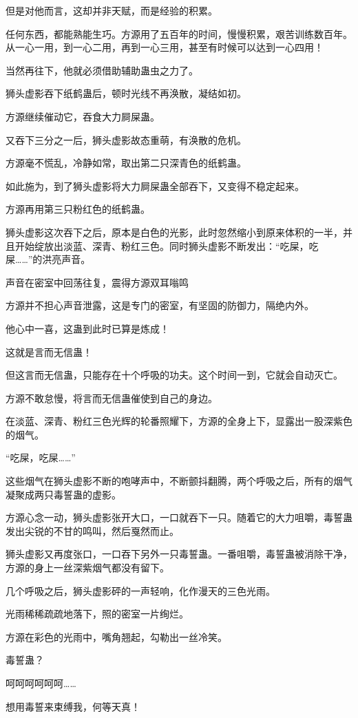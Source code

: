 \begin{this_body}
但是对他而言，这却并非天赋，而是经验的积累。

任何东西，都能熟能生巧。方源用了五百年的时间，慢慢积累，艰苦训练数百年。从一心一用，到一心二用，再到一心三用，甚至有时候可以达到一心四用！

当然再往下，他就必须借助辅助蛊虫之力了。

狮头虚影吞下纸鹤蛊后，顿时光线不再涣散，凝结如初。

方源继续催动它，吞食大力屙屎蛊。

又吞下三分之一后，狮头虚影故态重萌，有涣散的危机。

方源毫不慌乱，冷静如常，取出第二只深青色的纸鹤蛊。

如此施为，到了狮头虚影将大力屙屎蛊全部吞下，又变得不稳定起来。

方源再用第三只粉红色的纸鹤蛊。

狮头虚影这次吞下之后，原本是白色的光影，此时忽然缩小到原来体积的一半，并且开始绽放出淡蓝、深青、粉红三色。同时狮头虚影不断发出：“吃屎，吃屎……”的洪亮声音。

声音在密室中回荡往复，震得方源双耳嗡鸣

方源并不担心声音泄露，这是专门的密室，有坚固的防御力，隔绝内外。

他心中一喜，这蛊到此时已算是炼成！

这就是言而无信蛊！

但这言而无信蛊，只能存在十个呼吸的功夫。这个时间一到，它就会自动灭亡。

方源不敢怠慢，将言而无信蛊催使到自己的身边。

在淡蓝、深青、粉红三色光辉的轮番照耀下，方源的全身上下，显露出一股深紫色的烟气。

“吃屎，吃屎……”

这些烟气在狮头虚影不断的咆哮声中，不断颤抖翻腾，两个呼吸之后，所有的烟气凝聚成两只毒誓蛊的虚影。

方源心念一动，狮头虚影张开大口，一口就吞下一只。随着它的大力咀嚼，毒誓蛊发出尖锐的不甘的鸣叫，然后戛然而止。

狮头虚影又再度张口，一口吞下另外一只毒誓蛊。一番咀嚼，毒誓蛊被消除干净，方源的身上一丝深紫烟气都没有留下。

几个呼吸之后，狮头虚影砰的一声轻响，化作漫天的三色光雨。

光雨稀稀疏疏地落下，照的密室一片绚烂。

方源在彩色的光雨中，嘴角翘起，勾勒出一丝冷笑。

毒誓蛊？

呵呵呵呵呵呵……

想用毒誓来束缚我，何等天真！


\end{this_body}
